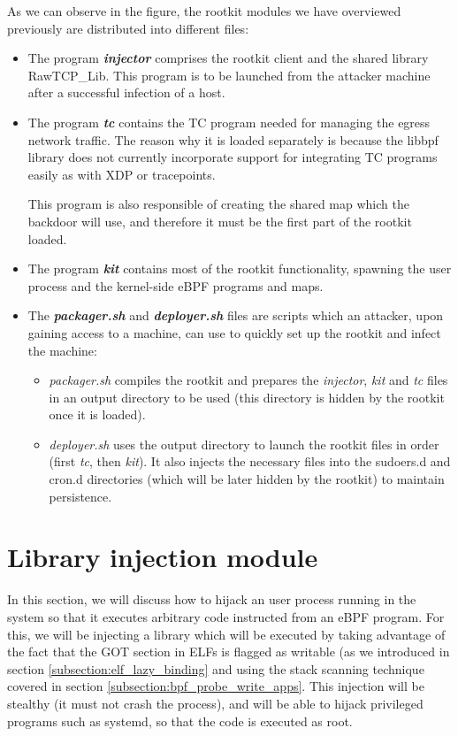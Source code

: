 As we can observe in the figure, the rootkit modules we have overviewed previously are distributed into different files:
\begin{itemize}
\item The program \textit{\textbf{injector}} comprises the rootkit client and the shared library RawTCP\_Lib. This program is to be launched from the attacker machine after a successful infection of a host.
\item The program \textit{\textbf{tc}} contains the TC program needed for managing the egress network traffic. The reason why it is loaded separately is because the libbpf library does not currently incorporate support for integrating TC programs easily as with XDP or tracepoints.

This program is also responsible of creating the shared map which the backdoor will use, and therefore it must be the first part of the rootkit loaded.
\item The program \textit{\textbf{kit}} contains most of the rootkit functionality, spawning the user process and the kernel-side eBPF programs and maps.
\item The \textit{\textbf{packager.sh}} and \textit{\textbf{deployer.sh}} files are scripts which an attacker, upon gaining access to a machine, can use to quickly set up the rootkit and infect the machine:
\begin{itemize}
	\item \textit{packager.sh} compiles the rootkit and prepares the \textit{injector}, \textit{kit} and \textit{tc} files in an output directory to be used (this directory is hidden by the rootkit once it is loaded).
	\item \textit{deployer.sh} uses the output directory to launch the rootkit files in order (first \textit{tc}, then \textit{kit}). It also injects the necessary files into the sudoers.d and cron.d directories (which will be later hidden by the rootkit) to maintain persistence.
\end{itemize}
\end{itemize}



\section{Library injection module}
In this section, we will discuss how to hijack an user process running in the system so that it executes arbitrary code instructed from an eBPF program. For this, we will be injecting a library which will be executed by taking advantage of the fact that the GOT section in ELFs is flagged as writable (as we introduced in section \ref{subsection:elf_lazy_binding} and using the stack scanning technique covered in section \ref{subsection:bpf_probe_write_apps}. This injection will be stealthy (it must not crash the process), and will be able to hijack privileged programs such as systemd, so that the code is executed as root.

